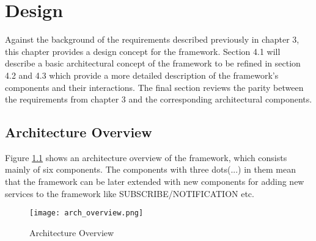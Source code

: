 \chapter{Design\label{cha:chapter4}}
Against the background of the requirements described previously in chapter 3, this chapter provides a design concept for the framework. Section 4.1 will describe a basic architectural concept of the framework to be refined in section 4.2 and 4.3 which provide a more detailed description of the framework's components and their interactions. The final section reviews the parity between the requirements from chapter 3 and the corresponding architectural components. 
        


\section{Architecture Overview\label{sec:des_ar_ov}}
Figure \ref{fig:arch_overview} shows an architecture overview of the framework, which consists mainly of six components. The components with three dots(...) in them mean that the framework can be later extended with new components for adding new services to the framework like SUBSCRIBE/NOTIFICATION etc.

\begin{figure}[htb]
  \centering
  \texttt{[image: arch\_overview.png]}\\
  \caption{Architecture Overview}
  \label{fig:arch_overview}
\end{figure}

%
%

